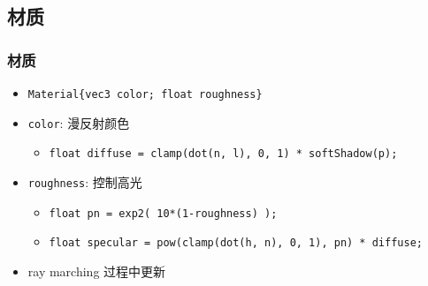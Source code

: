 \documentclass[aspectratio=169]{ctexbeamer} %
\begin{document}
\subsection{材质}
\begin{frame}
    \frametitle{材质}
    \begin{itemize}[<+->]
        \item \texttt{Material\{vec3 color; float roughness\}}
        \item \texttt{color}: 漫反射颜色
        \begin{itemize}
            \item \texttt{float diffuse = clamp(dot(n, l), 0, 1) * softShadow(p);}
        \end{itemize}
        \item \texttt{roughness}: 控制高光
        \begin{itemize}
            \item \texttt{float pn = exp2( 10*(1-roughness) );}
            \item \texttt{float specular = pow(clamp(dot(h, n), 0, 1), pn) * diffuse;}
        \end{itemize}
        \item ray marching 过程中更新
    \end{itemize}
\end{frame}
\end{document}
